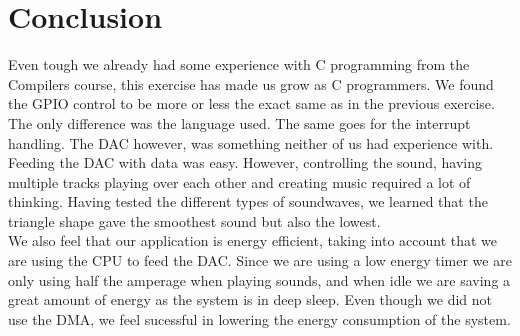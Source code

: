 \section{Conclusion}
Even tough we already had some experience with C programming from the Compilers course, this exercise has made us grow as C programmers. We found the GPIO control to be more or less the exact same as in the previous exercise. The only difference was the language used. The same goes for the interrupt handling. The DAC however, was something neither of us had experience with. Feeding the DAC with data was easy. However, controlling the sound, having multiple tracks playing over each other and creating music required a lot of thinking. Having tested the different types of soundwaves, we learned that the triangle shape gave the smoothest sound but also the lowest. \\

We also feel that our application is energy efficient, taking into account that we are using the CPU to feed the DAC. Since we are using a low energy timer we are only using half the amperage when playing sounds, and when idle we are saving a great amount of energy as the system is in deep sleep. Even though we did not use the DMA, we feel sucessful in lowering the energy consumption of the system.
   
